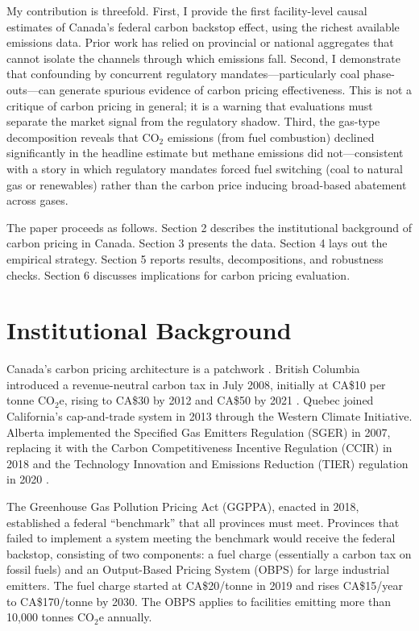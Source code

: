 \documentclass[12pt]{article}
\begin{document}
My contribution is threefold. First, I provide the first facility-level causal estimates of Canada's federal carbon backstop effect, using the richest available emissions data. Prior work has relied on provincial or national aggregates that cannot isolate the channels through which emissions fall. Second, I demonstrate that confounding by concurrent regulatory mandates---particularly coal phase-outs---can generate spurious evidence of carbon pricing effectiveness. This is not a critique of carbon pricing in general; it is a warning that evaluations must separate the market signal from the regulatory shadow. Third, the gas-type decomposition reveals that CO$_2$ emissions (from fuel combustion) declined significantly in the headline estimate but methane emissions did not---consistent with a story in which regulatory mandates forced fuel switching (coal to natural gas or renewables) rather than the carbon price inducing broad-based abatement across gases.

The paper proceeds as follows. Section 2 describes the institutional background of carbon pricing in Canada. Section 3 presents the data. Section 4 lays out the empirical strategy. Section 5 reports results, decompositions, and robustness checks. Section 6 discusses implications for carbon pricing evaluation.


\section{Institutional Background}

Canada's carbon pricing architecture is a patchwork \citep{winter_rivers_2020}. British Columbia introduced a revenue-neutral carbon tax in July 2008, initially at CA\$10 per tonne CO$_2$e, rising to CA\$30 by 2012 and CA\$50 by 2021 \citep{yamazaki_2017}. Quebec joined California's cap-and-trade system in 2013 through the Western Climate Initiative. Alberta implemented the Specified Gas Emitters Regulation (SGER) in 2007, replacing it with the Carbon Competitiveness Incentive Regulation (CCIR) in 2018 and the Technology Innovation and Emissions Reduction (TIER) regulation in 2020 \citep{leach_2012}.

The Greenhouse Gas Pollution Pricing Act (GGPPA), enacted in 2018, established a federal ``benchmark'' that all provinces must meet. Provinces that failed to implement a system meeting the benchmark would receive the federal backstop, consisting of two components: a fuel charge (essentially a carbon tax on fossil fuels) and an Output-Based Pricing System (OBPS) for large industrial emitters. The fuel charge started at CA\$20/tonne in 2019 and rises CA\$15/year to CA\$170/tonne by 2030. The OBPS applies to facilities emitting more than 10,000 tonnes CO$_2$e annually.
\end{document}
